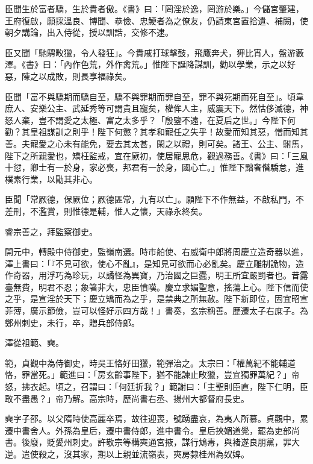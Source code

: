 \begin{pinyinscope}
 臣聞生於富者驕，生於貴者傲。《書》曰：「罔淫於逸，罔游於樂。」今儲宮肇建，王府復啟，願採溫良、博聞、恭儉、忠鯁者為之僚友，仍請東宮置拾遺、補闕，使朝夕講論，出入侍從，授以訓誥，交修不逮。



 臣又聞「馳騁畋獵，令人發狂」。今貴戚打球擊鼓，飛鷹奔犬，狎比宵人，盤游藪澤。《書》曰：「內作色荒，外作禽荒。」惟陛下誕降謀訓，勸以學業，示之以好惡，陳之以成敗，則長享福祿矣。



 臣聞「富不與驕期而驕自至，驕不與罪期而罪自至，罪不與死期而死自至」。頃韋庶人、安樂公主、武延秀等可謂貴且寵矣，權侔人主，威震天下。然怙侈滅德，神怒人棄，豈不謂愛之太極、富之太多乎？「殷鑒不遠，在夏后之世。」今陛下何勸？其皇祖謀訓之則乎！陛下何懲？其孝和寵任之失乎！故愛而知其惡，憎而知其善。夫寵愛之心未有能免，要去其太甚，閑之以禮，則可矣。諸王、公主、駙馬，陛下之所親愛也，矯枉監戒，宜在厥初，使居寵思危，觀過務善。《書》曰：「三風十愆，卿士有一於身，家必喪，邦君有一於身，國心亡。」惟陛下黜奢僭驕怠，進樸素行業，以勖其非心。



 臣聞「常厥德，保厥位；厥德匪常，九有以亡」。願陛下不作無益，不啟私門，不差刑，不濫賞，則惟德是輔，惟人之懷，天祿永終矣。



 睿宗善之，拜監察御史。



 開元中，轉殿中侍御史，監嶺南選。時市舶使、右威衛中郎將周慶立造奇器以進，澤上書曰：「『不見可欲，使心不亂』，是知見可欲而心必亂矣。慶立雕制詭物，造作奇器，用浮巧為珍玩，以譎怪為異寶，乃治國之巨蠹，明王所宜嚴罰者也。昔露臺無費，明君不忍；象箸非大，忠臣憤嘆。慶立求媚聖意，搖蕩上心。陛下信而使之乎，是宣淫於天下；慶立矯而為之乎，是禁典之所無赦。陛下新即位，固宜昭宣菲薄，廣示節儉，豈可以怪好示四方哉！」書奏，玄宗稱善。歷遷太子右庶子。為鄭州刺史，未行，卒，贈兵部侍郎。



 澤從祖範、奭。



 範，貞觀中為侍御史，時吳王恪好田獵，範彈治之。太宗曰：「權萬紀不能輔道恪，罪當死。」範進曰：「房玄齡事陛下，猶不能諫止畋獵，豈宜獨罪萬紀？」帝怒，拂衣起。頃之，召謂曰：「何廷折我？」範謝曰：「主聖則臣直，陛下仁明，臣敢不盡愚？」帝乃解。高宗時，歷尚書右丞、揚州大都督府長史。



 奭字子邵。以父隋時使高麗卒焉，故往迎喪，號踴盡哀，為夷人所慕。貞觀中，累遷中書舍人。外孫為皇后，遷中書侍郎，進中書令。皇后挾媚道覺，罷為吏部尚書。後廢，貶愛州刺史。許敬宗等構奭通宮掖，謀行鴆毒，與褚遂良朋黨，罪大逆。遣使殺之，沒其家，期以上親並流嶺表，奭房隸桂州為奴婢。




\end{pinyinscope}
